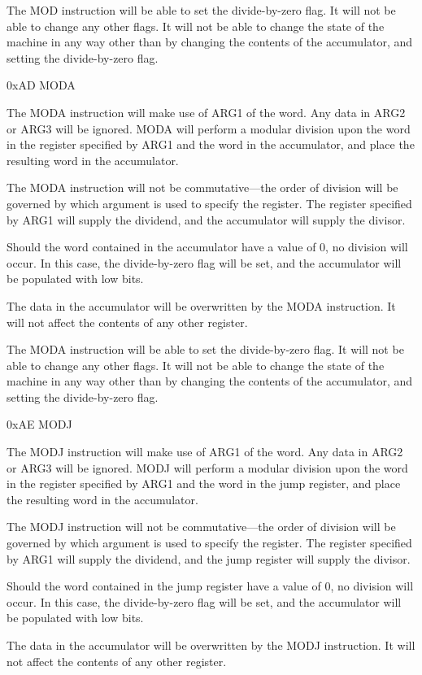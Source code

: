 \documentclass[]{article}
\begin{document}
The MOD instruction will be able to set the divide-by-zero flag. It will
not be able to change any other flags. It will not be able to change the
state of the machine in any way other than by changing the contents of
the accumulator, and setting the divide-by-zero flag.

0xAD MODA

The MODA instruction will make use of ARG1 of the word. Any data in ARG2
or ARG3 will be ignored. MODA will perform a modular division upon the
word in the register specified by ARG1 and the word in the accumulator,
and place the resulting word in the accumulator.

The MODA instruction will not be commutative---the order of division
will be governed by which argument is used to specify the register. The
register specified by ARG1 will supply the dividend, and the accumulator
will supply the divisor.

Should the word contained in the accumulator have a value of 0, no
division will occur. In this case, the divide-by-zero flag will be set,
and the accumulator will be populated with low bits.~

The data in the accumulator will be overwritten by the MODA instruction.
It will not affect the contents of any other register.

The MODA instruction will be able to set the divide-by-zero flag. It
will not be able to change any other flags. It will not be able to
change the state of the machine in any way other than by changing the
contents of the accumulator, and setting the divide-by-zero flag.

0xAE MODJ

The MODJ instruction will make use of ARG1 of the word. Any data in ARG2
or ARG3 will be ignored. MODJ will perform a modular division upon the
word in the register specified by ARG1 and the word in the jump
register, and place the resulting word in the accumulator.

The MODJ instruction will not be commutative---the order of division
will be governed by which argument is used to specify the register. The
register specified by ARG1 will supply the dividend, and the jump
register will supply the divisor.

Should the word contained in the jump register have a value of 0, no
division will occur. In this case, the divide-by-zero flag will be set,
and the accumulator will be populated with low bits.~

The data in the accumulator will be overwritten by the MODJ instruction.
It will not affect the contents of any other register.
\end{document}
